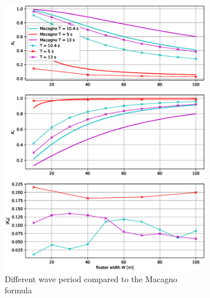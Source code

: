 \begin{figure}[H]
\begin{subfigure}[b]{0.49\textwidth}
        \includegraphics[width=\textwidth]{figures/Validation/magagno_investigation_different_waveperiods.eps}
        \caption[]%
        {{\small}Different wave period compared to the Macagno formula}    
        \label{fig:check different periods macagno}
    \end{subfigure}

    
    \caption{}
    \label{}
\end{figure}



